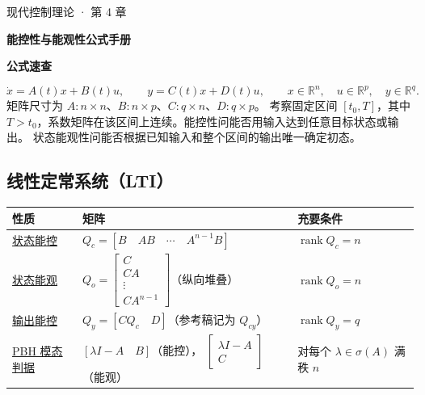 \documentclass[UTF8,a4paper,12pt,fontset=fandol]{ctexart}
\DeclareMathOperator{\rank}{rank}
\begin{document}
\color{ink}
\setlength{\abovedisplayskip}{7pt plus 2pt minus 1pt}
\setlength{\belowdisplayskip}{7pt plus 2pt minus 1pt}
\setlength{\abovedisplayshortskip}{5pt plus 1pt}
\setlength{\belowdisplayshortskip}{5pt plus 1pt}
\thispagestyle{opening}

{\large\color{teal}现代控制理论 · 第 4 章\par}
\vspace{3pt}
{\fontsize{28}{35}\selectfont\bfseries 能控性与能观性公式手册\par}
\vspace{5pt}
{\large\bfseries 公式速查\par}

\[
  \dot x=A(t)x+B(t)u,\qquad y=C(t)x+D(t)u,\qquad
  x\in\mathbb R^n,\quad u\in\mathbb R^p,\quad y\in\mathbb R^q .
\]
矩阵尺寸为 $A\colon n\times n$、$B\colon n\times p$、$C\colon q\times n$、$D\colon q\times p$。
考察固定区间 $[t_0,T]$，其中 $T>t_0$，系数矩阵在该区间上连续。能控性问能否用输入达到任意目标状态或输出。
状态能观性问能否根据已知输入和整个区间的输出唯一确定初态。

\subsection*{线性定常系统（LTI）}
\begingroup
\setlength{\extrarowheight}{5pt}
\begin{tabularx}{\linewidth}{@{}p{30mm}>{\raggedright\arraybackslash}X l@{}}
\toprule
\textbf{性质} & \textbf{矩阵} & \textbf{充要条件} \\
\midrule
\hyperref[sec:lti]{状态能控} &
  $Q_c=[B\quad AB\quad\cdots\quad A^{n-1}B]$ & $\rank Q_c=n$ \\
\hyperref[sec:lti]{状态能观} &
  $Q_o=\left[\begin{smallmatrix}C\\ CA\\ \vdots\\ CA^{n-1}\end{smallmatrix}\right]$（纵向堆叠） & $\rank Q_o=n$ \\
\hyperref[sec:lti]{输出能控} &
  $Q_y=[CQ_c\quad D]$（参考稿记为 $Q_{cy}$） & $\rank Q_y=q$ \\
\hyperref[sec:pbh]{PBH 模态判据} &
  $[\lambda I-A\quad B]$（能控），
  $\begin{bmatrix}\lambda I-A\\ C\end{bmatrix}$（能观） &
  对每个 $\lambda\in\sigma(A)$ 满秩 $n$ \\
\bottomrule
\end{tabularx}
\endgroup
\end{document}

